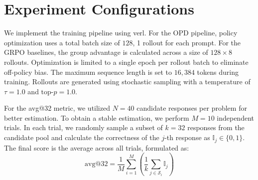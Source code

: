 \documentclass[11pt]{article}
\begin{document}


\appendix

\section{Experiment Configurations}
We implement the training pipeline using {verl}.
For the OPD pipeline, policy optimization uses a total batch size of $128$, 1 rollout for each prompt. 
For the GRPO baselines, the group advantage is calculated across a size of $128 \times 8$ rollouts. Optimization is limited to a single epoch per rollout batch to eliminate off-policy bias.
The maximum sequence length is set to $16,384$ tokens during training. 
Rollouts are generated using stochastic sampling with a temperature of $\tau = 1.0$ and $\text{top-}p = 1.0$.

For the avg@32 metric, we utilized $N=40$ candidate responses per problem for better estimation. To obtain a stable estimation, we perform $M=10$ independent trials. In each trial, we randomly sample a subset of $k=32$ responses from the candidate pool and calculate the correctness of the $j$-th response as $\mathbb{I}_j \in \{0, 1\}$. The final score is the average across all trials, formulated as:
\begin{equation}
\text{avg@}32 = \frac{1}{M} \sum_{i=1}^{M} \left( \frac{1}{k} \sum_{j \in \mathcal{S}_i} \mathbb{I}_j \right)
\end{equation}

\end{document}
